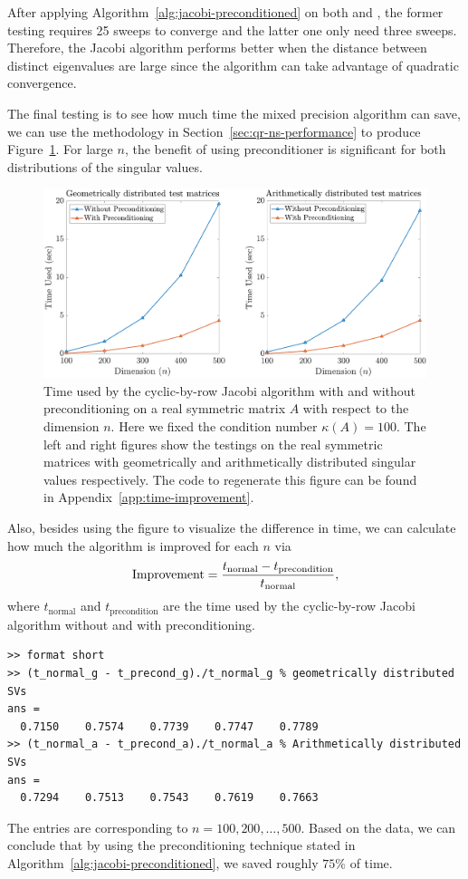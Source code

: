 After applying Algorithm~\ref{alg:jacobi-preconditioned} on both  and , the former testing requires 25 sweeps to converge and the latter one only need three sweeps. Therefore, the Jacobi algorithm performs better when the distance between distinct eigenvalues are large since the algorithm can take advantage of quadratic convergence.

The final testing is to see how much time the mixed precision algorithm can save, we can use the methodology in Section~\ref{sec:qr-ns-performance} to produce Figure~\ref{fig:time-improvement}. For large $n$, the benefit of using preconditioner is significant for both distributions of the singular values.

\begin{figure}[ht]
\centering
\includegraphics[width=1\textwidth]{figs/time_improvement.pdf}
\caption[Time used by the cyclic-by-row Jacobi algorithm with and without preconditioning.]{Time used by the cyclic-by-row Jacobi algorithm with and without preconditioning on a real symmetric matrix $A$ with respect to the dimension $n$. Here we fixed the condition number $\kappa(A) = 100$. The left and right figures show the testings on the real symmetric matrices with geometrically and arithmetically distributed singular values respectively. The code to regenerate this figure can be found in Appendix~\ref{app:time-improvement}.}
\label{fig:time-improvement}
\end{figure}



Also, besides using the figure to visualize the difference in time, we can calculate how much the algorithm is improved for each $n$ via
\begin{equation}\notag
  \text{Improvement} = \frac{t_{\text{normal}} - t_{\text{precondition}}}{t_{\text{normal}}},
\end{equation}
where $t_{\text{normal}}$ and $t_{\text{precondition}}$ are the time used by the cyclic-by-row Jacobi algorithm without and with preconditioning.

\begin{lstlisting}
>> format short
>> (t_normal_g - t_precond_g)./t_normal_g % geometrically distributed SVs
ans =
  0.7150    0.7574    0.7739    0.7747    0.7789
>> (t_normal_a - t_precond_a)./t_normal_a % Arithmetically distributed SVs
ans =
  0.7294    0.7513    0.7543    0.7619    0.7663
\end{lstlisting}
The entries are corresponding to $n = 100,200,\dots,500$. Based on the data, we can conclude that by using the preconditioning technique stated in Algorithm~\ref{alg:jacobi-preconditioned}, we saved roughly $75\%$ of time.